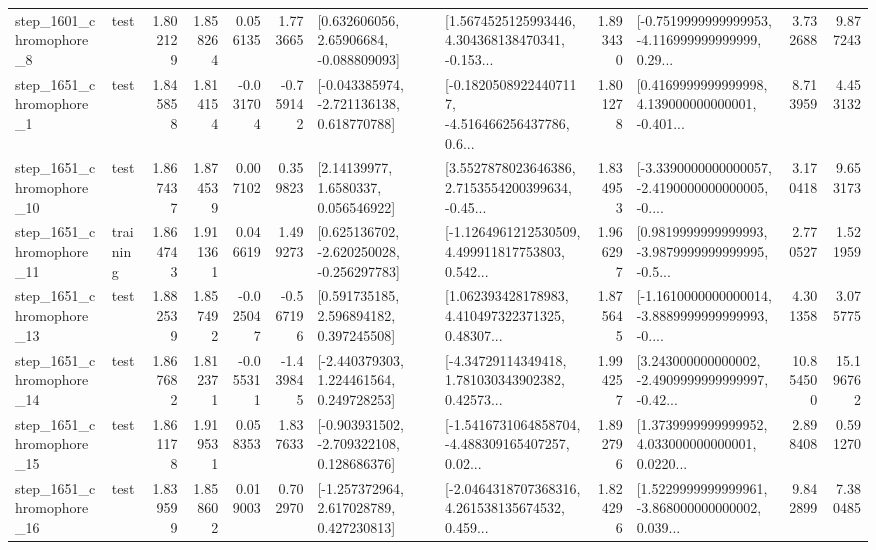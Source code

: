 \begin{tabular}{llrrrrllrlrr}
  step\_1601\_chromophore\_8 &      test &      1.802129 &    1.858264 &      0.056135 &  1.773665 &     [0.632606056, 2.65906684, -0.088809093] &  [1.5674525125993446, 4.304368138470341, -0.153... &       1.893430 &  [-0.7519999999999953, -4.116999999999999, 0.29... &            3.732688 &          9.877243 \\
  step\_1651\_chromophore\_1 &      test &      1.845858 &    1.814154 &     -0.031704 & -0.759142 &   [-0.043385974, -2.721136138, 0.618770788] &  [-0.18205089224407117, -4.516466256437786, 0.6... &       1.801278 &  [0.4169999999999998, 4.139000000000001, -0.401... &            8.713959 &          4.453132 \\
 step\_1651\_chromophore\_10 &      test &      1.867437 &    1.874539 &      0.007102 &  0.359823 &        [2.14139977, 1.6580337, 0.056546922] &  [3.5527878023646386, 2.7153554200399634, -0.45... &       1.834953 &  [-3.3390000000000057, -2.4190000000000005, -0.... &            3.170418 &          9.653173 \\
 step\_1651\_chromophore\_11 &  training &      1.864743 &    1.911361 &      0.046619 &  1.499273 &   [0.625136702, -2.620250028, -0.256297783] &  [-1.1264961212530509, 4.499911817753803, 0.542... &       1.966297 &  [0.9819999999999993, -3.9879999999999995, -0.5... &            2.770527 &          1.521959 \\
 step\_1651\_chromophore\_13 &      test &      1.882539 &    1.857492 &     -0.025047 & -0.567196 &     [0.591735185, 2.596894182, 0.397245508] &  [1.062393428178983, 4.410497322371325, 0.48307... &       1.875645 &  [-1.1610000000000014, -3.8889999999999993, -0.... &            4.301358 &          3.075775 \\
 step\_1651\_chromophore\_14 &      test &      1.867682 &    1.812371 &     -0.055311 & -1.439845 &    [-2.440379303, 1.224461564, 0.249728253] &  [-4.34729114349418, 1.781030343902382, 0.42573... &       1.994257 &  [3.243000000000002, -2.4909999999999997, -0.42... &           10.854500 &         15.196762 \\
 step\_1651\_chromophore\_15 &      test &      1.861178 &    1.919531 &      0.058353 &  1.837633 &   [-0.903931502, -2.709322108, 0.128686376] &  [-1.5416731064858704, -4.488309165407257, 0.02... &       1.892796 &  [1.3739999999999952, 4.033000000000001, 0.0220... &            2.898408 &          0.591270 \\
 step\_1651\_chromophore\_16 &      test &      1.839599 &    1.858602 &      0.019003 &  0.702970 &    [-1.257372964, 2.617028789, 0.427230813] &  [-2.0464318707368316, 4.261538135674532, 0.459... &       1.824296 &  [1.5229999999999961, -3.868000000000002, 0.039... &            9.842899 &          7.380485 \\

\end{tabular}
